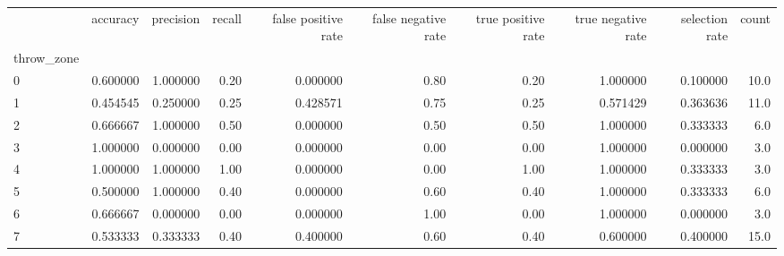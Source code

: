 \begin{tabular}{lrrrrrrrrr}
\toprule
{} &  accuracy &  precision &  recall &  false positive rate &  false negative rate &  true positive rate &  true negative rate &  selection rate &  count \\
throw\_zone &           &            &         &                      &                      &                     &                     &                 &        \\
\midrule
0          &  0.600000 &   1.000000 &    0.20 &             0.000000 &                 0.80 &                0.20 &            1.000000 &        0.100000 &   10.0 \\
1          &  0.454545 &   0.250000 &    0.25 &             0.428571 &                 0.75 &                0.25 &            0.571429 &        0.363636 &   11.0 \\
2          &  0.666667 &   1.000000 &    0.50 &             0.000000 &                 0.50 &                0.50 &            1.000000 &        0.333333 &    6.0 \\
3          &  1.000000 &   0.000000 &    0.00 &             0.000000 &                 0.00 &                0.00 &            1.000000 &        0.000000 &    3.0 \\
4          &  1.000000 &   1.000000 &    1.00 &             0.000000 &                 0.00 &                1.00 &            1.000000 &        0.333333 &    3.0 \\
5          &  0.500000 &   1.000000 &    0.40 &             0.000000 &                 0.60 &                0.40 &            1.000000 &        0.333333 &    6.0 \\
6          &  0.666667 &   0.000000 &    0.00 &             0.000000 &                 1.00 &                0.00 &            1.000000 &        0.000000 &    3.0 \\
7          &  0.533333 &   0.333333 &    0.40 &             0.400000 &                 0.60 &                0.40 &            0.600000 &        0.400000 &   15.0 \\
\bottomrule
\end{tabular}
